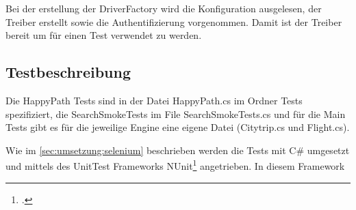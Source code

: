 Bei der erstellung der DriverFactory wird die Konfiguration ausgelesen, der Treiber erstellt sowie die Authentifizierung vorgenommen. Damit ist der Treiber bereit um für einen Test verwendet zu werden.


\subsection{Testbeschreibung}
Die HappyPath Tests sind in der Datei HappyPath.cs im Ordner Tests spezifiziert, die SearchSmokeTests im File SearchSmokeTests.cs und für die Main Tests gibt es für die jeweilige Engine eine eigene Datei (Citytrip.cs und Flight.cs).


Wie im \cref{sec:umsetzung:selenium}  beschrieben werden die Tests mit C\# umgesetzt und mittels des UnitTest Frameworks NUnit\footcite{NUnit_-_Home_2015-09-26} angetrieben.
In diesem Framework